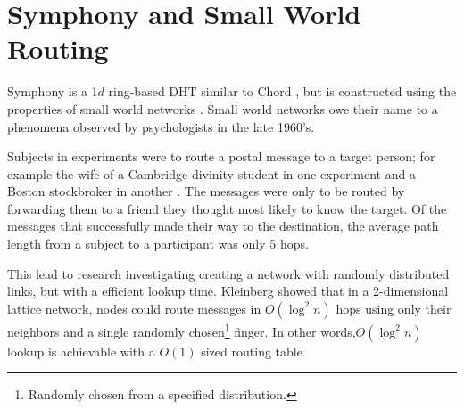 





\section{Symphony and Small World Routing}
Symphony  \cite{symphony} is a 1$d$ ring-based DHT similar to Chord \cite{chord}, but is constructed using the properties of small world networks \cite{kleinberg2000small}.
Small world networks owe their name to a phenomena observed by psychologists in the late 1960's. 

Subjects in experiments were to route a postal message to a target person; for example the wife of a Cambridge divinity student in one experiment and a Boston stockbroker in another \cite{milgram1967small}.
The messages were only to be routed by forwarding them to a friend they thought most likely to know the target.
Of the messages that successfully made their way to the destination, the average path length from a subject to a participant was only 5 hops.  

This lead to research investigating creating a network with randomly distributed links, but with a efficient lookup time.
Kleinberg \cite{kleinberg2000navigation} showed that in a 2-dimensional lattice network, nodes could route messages in $O(\log^{2}n)$ hops using only their neighbors and a single randomly chosen\footnote{Randomly chosen from a specified distribution.} finger.
In other words,$O(\log^{2}n)$ lookup is achievable with a $O(1)$ sized routing table.

